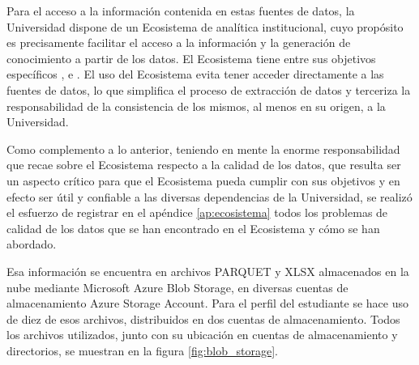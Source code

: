 Para el acceso a la información contenida en estas fuentes de datos, la Universidad dispone de un Ecosistema de analítica institucional, cuyo propósito es precisamente facilitar el acceso a la información y la generación de conocimiento a partir de los datos. El Ecosistema tiene entre sus objetivos específicos ,  e . \cite{ecosistema} El uso del Ecosistema evita tener acceder directamente a las fuentes de datos, lo que simplifica el proceso de extracción de datos y terceriza la responsabilidad de la consistencia de los mismos, al menos en su origen, a la Universidad.

Como complemento a lo anterior, teniendo en mente la enorme responsabilidad que recae sobre el Ecosistema respecto a la calidad de los datos, que resulta ser un aspecto crítico para que el Ecosistema pueda cumplir con sus objetivos y en efecto ser útil y confiable a las diversas dependencias de la Universidad, se realizó el esfuerzo de registrar en el apéndice \ref{ap:ecosistema} todos los problemas de calidad de los datos que se han encontrado en el Ecosistema y cómo se han abordado.


Esa información se encuentra en archivos PARQUET y XLSX almacenados en la nube mediante Microsoft Azure Blob Storage, en diversas cuentas de almacenamiento Azure Storage Account. Para el perfil del estudiante se hace uso de diez de esos archivos, distribuidos en dos cuentas de almacenamiento. Todos los archivos utilizados, junto con su ubicación en cuentas de almacenamiento y directorios, se muestran en la figura \ref{fig:blob_storage}.

